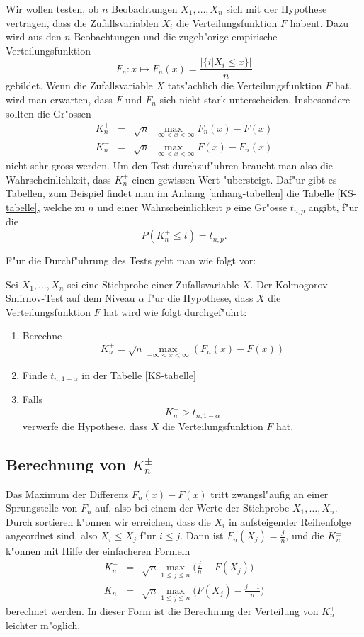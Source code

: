 Wir wollen testen, ob $n$ Beobachtungen $X_1,\dots,X_n$ sich mit
der Hypothese vertragen, dass die Zufallsvariablen $X_i$ die
Verteilungsfunktion $F$ habent. Dazu wird aus den $n$ Beobachtungen
und die zugeh"orige empirische Verteilungsfunktion
$$F_n\colon x\mapsto F_n(x)=\frac{|\{i|X_i\le x\}|}{n}$$
gebildet. Wenn die Zufallsvariable $X$ tats"achlich die
Verteilungsfunktion $F$ hat, wird man erwarten,
dass $F$ und $F_n$ sich nicht stark unterscheiden.
Insbesondere sollten die Gr"ossen
\begin{eqnarray}
K_n^+&=&\sqrt{n}\max_{-\infty<x<\infty} F_n(x)-F(x)\\
K_n^-&=&\sqrt{n}\max_{-\infty<x<\infty} F(x)-F_n(x)
\end{eqnarray}
nicht sehr gross werden. Um den Test durchzuf"uhren braucht man also
die Wahrscheinlichkeit, dass $K_n^{\pm}$ einen gewissen Wert "ubersteigt.
Daf"ur gibt es Tabellen, zum Beispiel findet man im Anhang \ref{anhang-tabellen}
die Tabelle \ref{KS-tabelle}, welche zu $n$ und einer Wahrscheinlichkeit
$p$ eine Gr"osse $t_{n,p}$ angibt, f"ur die
$$P(K_n^+\le t)=t_{n,p}.$$

F"ur die Durchf"uhrung des Tests geht man wie folgt vor:
\begin{satz} Sei $X_1,\dots,X_n$ sei eine Stichprobe einer Zufallsvariable $X$.
Der Kolmogorov-Smirnov-Test auf dem Niveau $\alpha$ f"ur die Hypothese,
dass $X$ die Verteilungsfunktion $F$ hat wird wie folgt durchgef"uhrt:
\begin{enumerate}
\item Berechne
$$K_n^+ = \sqrt{n}\max_{-\infty<x<\infty} (F_n(x)-F(x))$$
\item Finde $t_{n,1-\alpha}$ in der Tabelle \ref{KS-tabelle}
\item Falls
$$K_n^+>t_{n,1-\alpha}$$
verwerfe die Hypothese, dass $X$ die Verteilungsfunktion $F$ hat.
\end{enumerate}
\end{satz}

\subsection{Berechnung von $K_n^{\pm}$}
Das Maximum der Differenz $F_n(x)-F(x)$ tritt zwangsl"aufig an einer
Sprungstelle von $F_n$ auf, also bei einem der Werte der Stichprobe
$X_1,\dots,X_n$. Durch sortieren k"onnen wir erreichen, dass die
$X_i$  in aufsteigender Reihenfolge angeordnet sind, also $X_i\le X_j$
f"ur $i\le j$. Dann ist $F_n(X_j)=\frac{j}{n}$, und
die  $K_n^{\pm}$ k"onnen mit Hilfe der einfacheren Formeln
\begin{eqnarray}
K_n^+&=&\sqrt{n}\max_{1\le j\le n}\biggl(\frac{j}{n}-F(X_j)\biggr)
\label{knp-berechnungs-formel}
\\
K_n^-&=&\sqrt{n}\max_{1\le j\le n}\biggl(F(X_j)-\frac{j-1}n\biggr)
\end{eqnarray}
berechnet werden. In dieser Form ist die Berechnung der
Verteilung von $K_n^{\pm}$ leichter m"oglich.

